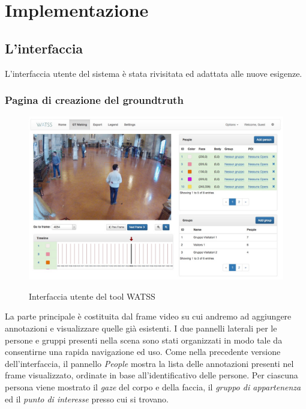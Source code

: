 \section{Implementazione}

\subsection{L'interfaccia}

L'interfaccia utente del sistema è stata rivisitata ed adattata alle nuove esigenze. 

\subsubsection{Pagina di creazione del groundtruth}

\begin{figure}
\begin{center}
\centering
\includegraphics[width=1\linewidth]{images/watss-gui.jpg}
  \label{fig:watss-gui}
  \caption{Interfaccia utente del tool WATSS}
\end{center}
\end{figure}

La parte principale è costituita dal frame video su cui andremo ad aggiungere annotazioni e visualizzare quelle già esistenti.
I due pannelli laterali per le persone e gruppi presenti nella scena sono stati organizzati in modo tale da consentirne una rapida navigazione ed uso. Come nella precedente versione dell'interfaccia, il pannello \emph{People} mostra la lista delle annotazioni presenti nel frame visualizzato, ordinate in base all'identificativo delle persone. Per ciascuna persona viene mostrato il \emph{gaze }del corpo e della faccia, il \emph{gruppo di appartenenza} ed il \emph{punto di interesse} presso cui si trovano. 

